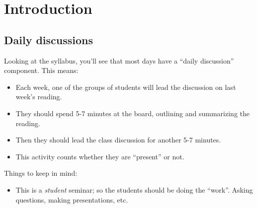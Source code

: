 
\section{Introduction}
\label{sec:introduction}

\subsection{Daily discussions}
\label{sec:daily-discussions}

Looking at the syllabus, you'll see that most days have a ``daily discussion'' component.  This means:

\begin{itemize}
\item Each week, one of the groups of students will lead the discussion on last week's reading.
\item They should spend 5-7 minutes at the board, outlining and summarizing the reading.  
\item Then they should lead the class discussion for another 5-7 minutes.
\item This activity counts whether they are ``present'' or not.  
\end{itemize}

Things to keep in mind:

\begin{itemize}
\item This is a \emph{student} seminar; so the students should be doing the ``work''.  Asking questions, making presentations, etc.
\end{itemize}


